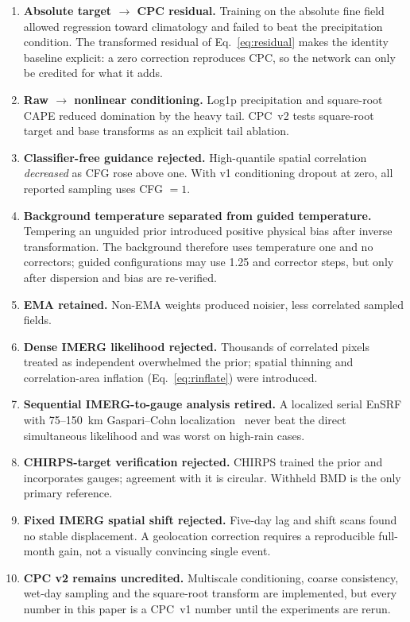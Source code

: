\documentclass[10pt,twocolumn]{article}
\begin{document}
\begin{enumerate}
\item \textbf{Absolute target $\rightarrow$ CPC residual.} Training on the
absolute fine field allowed regression toward climatology and failed to beat
the precipitation condition. The transformed residual of
Eq.~\eqref{eq:residual} makes the identity baseline explicit: a zero
correction reproduces CPC, so the network can only be credited for what it
adds.
\item \textbf{Raw $\rightarrow$ nonlinear conditioning.} Log1p precipitation
and square-root CAPE reduced domination by the heavy tail. CPC~v2 tests
square-root target and base transforms as an explicit tail ablation.
\item \textbf{Classifier-free guidance rejected.} High-quantile spatial
correlation \emph{decreased} as CFG rose above one. With v1 conditioning
dropout at zero, all reported sampling uses CFG $=1$.
\item \textbf{Background temperature separated from guided temperature.}
Tempering an unguided prior introduced positive physical bias after inverse
transformation. The background therefore uses temperature one and no
correctors; guided configurations may use 1.25 and corrector steps, but only
after dispersion and bias are re-verified.
\item \textbf{EMA retained.} Non-EMA weights produced noisier, less correlated
sampled fields.
\item \textbf{Dense IMERG likelihood rejected.} Thousands of correlated pixels
treated as independent overwhelmed the prior; spatial thinning and
correlation-area inflation (Eq.~\ref{eq:rinflate}) were introduced.
\item \textbf{Sequential IMERG-to-gauge analysis retired.} A localized serial
EnSRF with 75--150~km Gaspari--Cohn
localization~\cite{gaspari1999,whitaker2002} never beat the direct
simultaneous likelihood and was worst on high-rain cases.
\item \textbf{CHIRPS-target verification rejected.} CHIRPS trained the prior
and incorporates gauges; agreement with it is circular. Withheld BMD is the
only primary reference.
\item \textbf{Fixed IMERG spatial shift rejected.} Five-day lag and shift
scans found no stable displacement. A geolocation correction requires a
reproducible full-month gain, not a visually convincing single event.
\item \textbf{CPC v2 remains uncredited.} Multiscale conditioning, coarse
consistency, wet-day sampling and the square-root transform are implemented,
but every number in this paper is a CPC~v1 number until the experiments are
rerun.
\end{enumerate}
\end{document}
